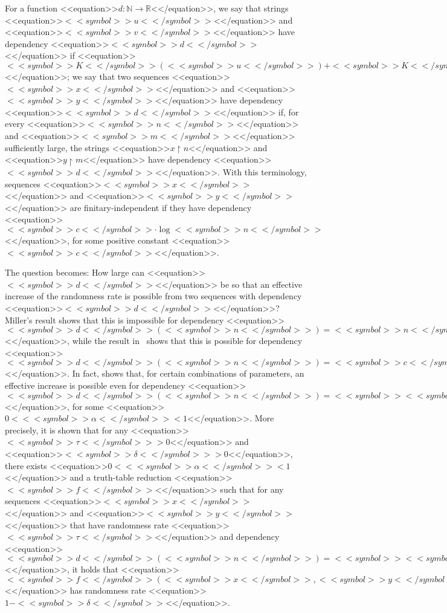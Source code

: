 \documentclass[proceedings]{stacs}
\def\mapping{\rightarrow}
\newcommand{\nat}{{\mathbb N}}
\newcommand{\real}{{\mathbb R}}
\newcommand{\rest}{{\upharpoonright}}
\begin{document}
For a function <<equation>>$d: \nat \mapping \real$<</equation>>, we say that strings <<equation>>$<<symbol>>u<</symbol>>$<</equation>> and <<equation>>$<<symbol>>v<</symbol>>$<</equation>> have dependency <<equation>>$<<symbol>>d<</symbol>>$<</equation>> if <<equation>>$<<symbol>>K<</symbol>>(<<symbol>>u<</symbol>>) + <<symbol>>K<</symbol>>(<<symbol>>v<</symbol>>) - <<symbol>>K<</symbol>>(<<symbol>>u<<symbol>><</symbol>>v<</symbol>>)  \leq <<symbol>>d<</symbol>>(\max(<<symbol>>|<<symbol>><</symbol>>u<<symbol>><</symbol>>|<</symbol>>,<<symbol>>|<<symbol>><</symbol>>v<<symbol>><</symbol>>|<</symbol>>))$<</equation>>; we say that two sequences <<equation>>$<<symbol>>x<</symbol>>$<</equation>> and <<equation>>$<<symbol>>y<</symbol>>$<</equation>> have dependency <<equation>>$<<symbol>>d<</symbol>>$<</equation>> if, for every <<equation>>$<<symbol>>n<</symbol>>$<</equation>> and <<equation>>$<<symbol>>m<</symbol>>$<</equation>> sufficiently large, the strings <<equation>>$x\rest n$<</equation>> and <<equation>>$y \rest m$<</equation>> have dependency <<equation>>$<<symbol>>d<</symbol>>$<</equation>>. With this terminology, sequences <<equation>>$<<symbol>>x<</symbol>>$<</equation>> and <<equation>>$<<symbol>>y<</symbol>>$<</equation>> are finitary-independent if they have dependency <<equation>>$<<symbol>>c<</symbol>> \cdot \log <<symbol>>n<</symbol>>$<</equation>>, for some positive constant <<equation>>$<<symbol>>c<</symbol>>$<</equation>>. 

The question becomes: How large can <<equation>>$<<symbol>>d<</symbol>>$<</equation>> be so that an effective increase of the randomness rate is possible from two sequences with dependency <<equation>>$<<symbol>>d<</symbol>>$<</equation>>?
Miller's result shows that this is impossible for dependency <<equation>>$<<symbol>>d<</symbol>>(<<symbol>>n<</symbol>>) = <<symbol>>n<</symbol>>$<</equation>>, while the result in~\cite{zim:c:csr} shows that this is possible for dependency <<equation>>$<<symbol>>d<</symbol>>(<<symbol>>n<</symbol>>) = <<symbol>>c<</symbol>> \cdot \log <<symbol>>n<</symbol>>$<</equation>>. In fact, \cite{zim:c:csr} shows that, for certain combinations of parameters, an effective increase is possible even for dependency <<equation>>$<<symbol>>d<</symbol>>(<<symbol>>n<</symbol>>) = <<symbol>><<symbol>>n<</symbol>>^<<symbol>>\alpha<</symbol>><</symbol>>$<</equation>>, for some <<equation>>$0 < <<symbol>>\alpha <</symbol>>< 1$<</equation>>. More precisely, it is shown that for any <<equation>>$<<symbol>>\tau <</symbol>>> 0$<</equation>> and <<equation>>$<<symbol>>\delta <</symbol>>> 0$<</equation>>, there exists <<equation>>$0 < <<symbol>>\alpha <</symbol>>< 1$<</equation>> and a truth-table reduction <<equation>>$<<symbol>>f<</symbol>>$<</equation>> such that for any sequences <<equation>>$<<symbol>>x<</symbol>>$<</equation>> and <<equation>>$<<symbol>>y<</symbol>>$<</equation>> that have randomness rate <<equation>>$<<symbol>>\tau<</symbol>>$<</equation>> and dependency <<equation>>$<<symbol>>d<</symbol>>(<<symbol>>n<</symbol>>) = <<symbol>><<symbol>>n<</symbol>>^<<symbol>>\alpha<</symbol>><</symbol>>$<</equation>>, it holds that <<equation>>$<<symbol>>f<</symbol>>(<<symbol>>x<</symbol>>,<<symbol>>y<</symbol>>)$<</equation>> has randomness rate <<equation>>$1 - <<symbol>>\delta<</symbol>>$<</equation>>.
\end{document}
